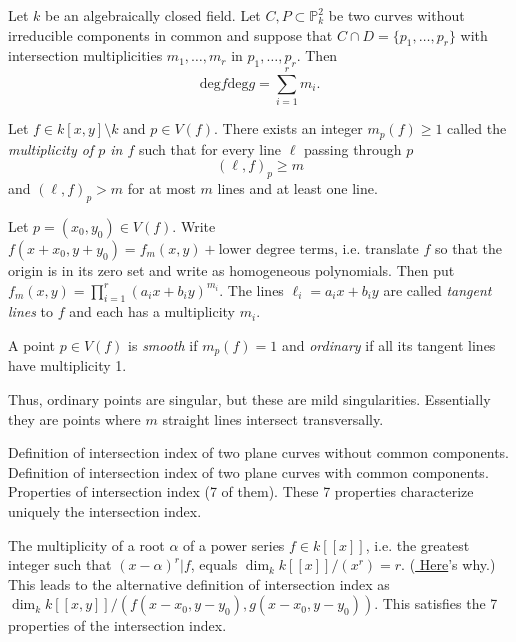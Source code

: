 \documentclass{book}
\begin{document}
\begin{theorem}[Bézout]
\label{theorem-bezout}
Let $k$ be an algebraically closed field.
Let  $C,P \subset \mathbb{P}_k^2$ be two
curves without
irreducible components in common
and suppose that $C \cap D= \{p_1,…,p_r\}$
with intersection multiplicities  $m_1,…,m_r$
in $p_1,…,p_r$.
Then
$$
\text{deg}f\text{deg}g=\sum_{i=1}^r m_i.
$$
\end{theorem}


\begin{proposition}
\label{proposition-multiplicity-point}
Let $f \in k[x,y]\setminus k$ and $p \in
V(f)$.
There exists an integer $m_p(f)\geq 1$ called
the {\it multiplicity of $p$ in $f$}
such that for every line $\ell$ passing
through  $p$
 $$
(\ell,f)_p \geq m
$$
and $(\ell,f)_p>m$ for at most $m$ lines and
at least one line.
\end{proposition}

\begin{definition}
\label{definition-tangent-line}
Let $p=(x_0,y_0) \in V(f)$.
Write $f(x+x_0,y+y_0)=f_m(x,y)+\text{lower
degree terms} $,
i.e. translate $f$ so that the origin is in
its zero set
and write as homogeneous polynomials.
Then put
$f_m(x,y)=\prod_{i=1}^r(a_ix+b_iy)^{m_i}$.
The lines $\ell_i=a_ix+b_iy$ are called
{\it tangent lines} to $f$ and each has a
multiplicity $m_i$.
\end{definition}

\begin{definition}
\label{definition-smoot-ordin-point-curve}
A point $p \in V(f)$ is {\it smooth} if
$m_p(f)=1$
and  {\it ordinary} if all its tangent lines
have multiplicity 1.
\end{definition}

\noindent
Thus, ordinary points are singular,
but these are mild singularities.
Essentially they are points where $m$
straight lines intersect transversally.

Definition of intersection index of two plane
curves
without common components.
Definition of intersection index of two plane
curves
with common components.
Properties of intersection index (7 of them).
These 7 properties characterize uniquely the
intersection index.

The multiplicity of a root $\alpha$ of a
power series
$f\in k[[x]]$,
i.e. the greatest integer such that
$(x-\alpha)^r|f$,
equals $\dim_k k[[x]]/(x^r)=r$.
(\href{https://www.youtube.com/live/%
EspNBiSU8F4?si=UEcdxrysAS47ZA9H&t=5230}{
Here}'s why.)
This leads to the alternative definition
of intersection index as
$\dim_k
k[[x,y]]/(f(x-x_0,y-y_0),g(x-x_0,y-y_0))$.
This satisfies the 7 properties of the
intersection index.
\end{document}
